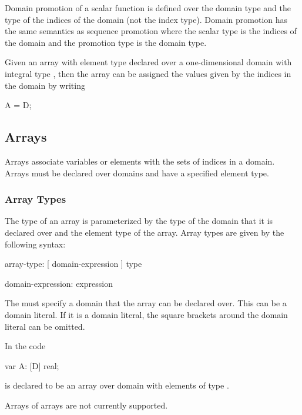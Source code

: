 Domain promotion of a scalar function is defined over the domain type
and the type of the indices of the domain (not the index type).
Domain promotion has the same semantics as sequence promotion where
the scalar type is the indices of the domain and the promotion type is
the domain type.

\begin{example}
Given an array  with element type  declared over a
one-dimensional domain  with integral type , then
the array can be assigned the values given by the indices in the
domain by writing
\begin{chapel}
A = D;
\end{chapel}
\end{example}

\subsection{Arrays}
\label{Arrays}

Arrays associate variables or elements with the sets of indices in a
domain.  Arrays must be declared over domains and have a specified
element type.

\subsubsection{Array Types}
\label{Array_Types}

The type of an array is parameterized by the type of the domain that
it is declared over and the element type of the array.  Array types
are given by the following syntax:
\begin{syntax}
array-type:
  [ domain-expression ] type

domain-expression:
  expression
\end{syntax}
The  must specify a domain that the array can
be declared over.  This can be a domain literal.  If it is a domain
literal, the square brackets around the domain literal can be omitted.

\begin{example}
In the code
\begin{chapel}
var A: [D] real;
\end{chapel}
 is declared to be an array over domain  with
elements of type .
\end{example}

\begin{implementation}
Arrays of arrays are not currently supported.
\end{implementation}

